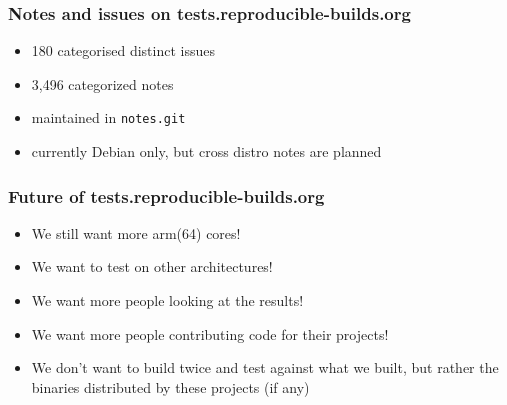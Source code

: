 \documentclass[14pt]{beamer}
\newif\ifplacelogo
\begin{document}
\begin{frame}
 \frametitle{Notes and issues on tests.reproducible-builds.org}

 \begin{itemize}
  \item { 180 categorised distinct issues }
  \item { 3,496 categorized notes }
  \item<2-3> { maintained in \texttt{notes.git} }
  \item<3> { currently Debian only, but cross distro notes are planned}
 \end{itemize}
\end{frame}


\begin{frame}
 \frametitle{Future of tests.reproducible-builds.org}

 \begin{itemize}
 \item We still want more arm(64) cores!
 \item We want to test on other architectures!
 \item We want more people looking at the results!
 \item We want more people contributing code for their projects!
 \item We don't want to build twice and test against what we built, but rather
 the binaries distributed by these projects (if any)
 \end{itemize}
\end{frame}

\placelogofalse
\end{document}
